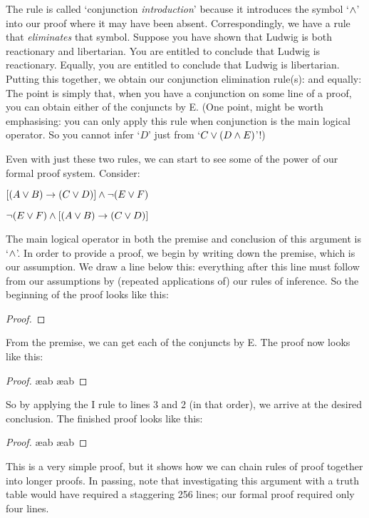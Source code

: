 The rule is called `conjunction \emph{introduction}' because it introduces the symbol `$\wedge$' into our proof where it may have been absent. Correspondingly, we have a rule that \emph{eliminates} that symbol.  Suppose you have shown that Ludwig is both reactionary and libertarian. You are entitled to conclude that Ludwig is reactionary. Equally, you are entitled to conclude that Ludwig is libertarian. Putting this together, we obtain our conjunction elimination rule(s):
and equally:
The point is simply that, when you have a conjunction on some line of a proof, you can obtain either of the conjuncts by {\eand}E. (One point, might be worth emphasising: you can only apply this rule when conjunction is the main logical operator. So you cannot infer `$D$' just from `$C \vee (D \wedge E)$'!)

Even with just these two rules, we can start to see some of the power of our formal proof system. Consider:
\begin{earg}
\item[] $[(A\vee B)\rightarrow(C\vee D)] \wedge \neg(E\vee F)$
\item[\therefore] $\neg(E\vee F) \wedge [(A\vee B)\rightarrow(C\vee D)]$
\end{earg}
The main logical operator in both the premise and conclusion of this argument is `$\wedge$'. In order to provide a proof, we begin by writing down the premise, which is our assumption. We draw a line below this: everything after this line must follow from our assumptions by (repeated applications of) our rules of inference. So the beginning of the proof looks like this:
\begin{proof}
\end{proof}
From the premise, we can get each of the conjuncts by {\eand}E. The proof now looks like this:
\begin{proof}
	 \ae{ab}
	 \ae{ab}
\end{proof}
So by applying the {\eand}I rule to lines 3 and 2 (in that order), we arrive at the desired conclusion. The finished proof looks like this:
\begin{proof}

	 \ae{ab}
	 \ae{ab}
	 
\end{proof}
This is a very simple proof, but it shows how we can chain rules of proof together into longer proofs. In passing, note that investigating this argument with a truth table would have required a staggering 256 lines; our formal proof required only four lines. 

